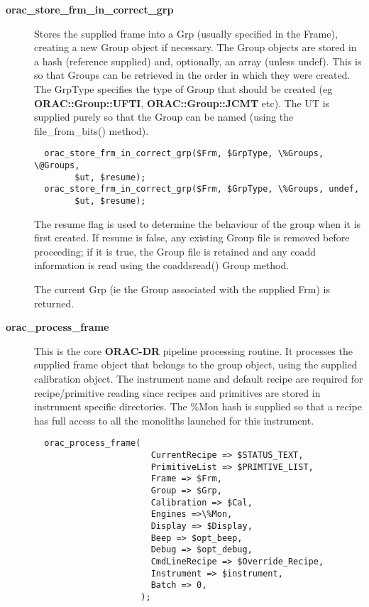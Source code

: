 \begin{description}

\item[\textbf{orac\_store\_frm\_in\_correct\_grp}] \mbox{}

Stores the supplied frame into a Grp (usually specified in the Frame),
creating a new Group object if necessary. The Group objects are stored
in a hash (reference supplied) and, optionally, an array (unless undef).
This is so that Groups can be retrieved in the order in which they
were created. The GrpType specifies the type of Group that should be
created (eg \textbf{ORAC::Group::UFTI}, \textbf{ORAC::Group::JCMT} etc). The UT
is supplied purely so that the Group can be named (using the 
file\_from\_bits() method).

\begin{verbatim}
  orac_store_frm_in_correct_grp($Frm, $GrpType, \%Groups, \@Groups,
        $ut, $resume);
  orac_store_frm_in_correct_grp($Frm, $GrpType, \%Groups, undef, 
        $ut, $resume);
\end{verbatim}


The resume flag is used to determine the behaviour of the group when
it is first created. If resume is false, any existing Group file is 
removed before proceeding; if it is true, the Group file is retained
and any coadd information is read using the coaddsread() Group
method.



The current Grp (ie the Group associated with the supplied Frm)
is returned.


\item[\textbf{orac\_process\_frame}] \mbox{}

This is the core \textbf{ORAC-DR} pipeline processing routine.
It processes the supplied frame object that belongs to the group object,
using the supplied calibration object. The instrument name and default
recipe are required for recipe/primitive reading since recipes and
primitives are stored in instrument specific directories.
The \%Mon hash is supplied so that a recipe has full access to
all the monoliths launched for this instrument.

\begin{verbatim}
  orac_process_frame(
                       CurrentRecipe => $STATUS_TEXT,
                       PrimitiveList => $PRIMTIVE_LIST,
                       Frame => $Frm,
                       Group => $Grp,
                       Calibration => $Cal,
                       Engines =>\%Mon,
                       Display => $Display,
                       Beep => $opt_beep,
                       Debug => $opt_debug,
                       CmdLineRecipe => $Override_Recipe,
                       Instrument => $instrument,
                       Batch => 0,
                     );
\end{verbatim}



\end{description}
